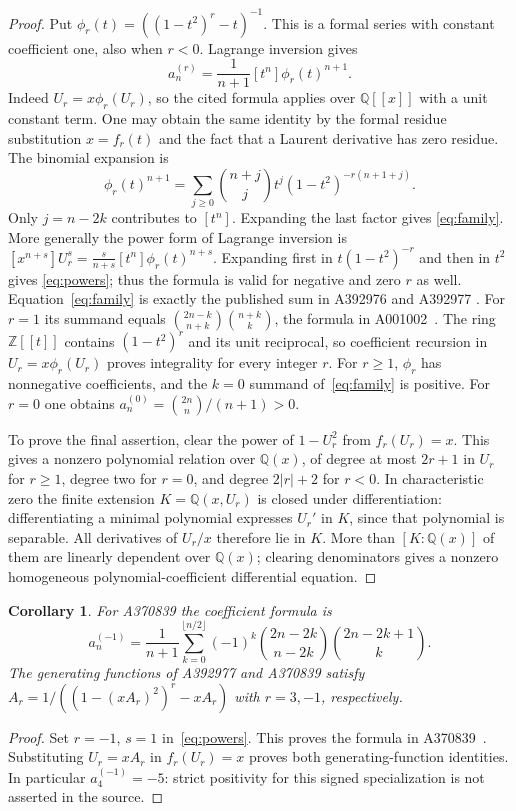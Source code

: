 \documentclass[10pt]{article}
\newtheorem{corollary}[theorem]{Corollary}
\newcommand{\Q}{\mathbb{Q}}
\newcommand{\Z}{\mathbb{Z}}
\begin{document}
\begin{proof}
Put $\phi_r(t)=((1-t^2)^r-t)^{-1}$. This is a formal series with
constant coefficient one, also when $r<0$. Lagrange inversion
\cite[Theorem 2.1.1, equation (2.1.1)]{gessel} gives
\begin{equation}\label{eq:lagrange}
 a_n^{(r)}=\frac{1}{n+1}[t^n]\phi_r(t)^{n+1}.
\end{equation}
Indeed $U_r=x\phi_r(U_r)$, so the cited formula applies over $\Q[[x]]$
with a unit constant term. One may obtain the same identity by the formal
residue substitution $x=f_r(t)$ and the fact that a Laurent derivative has
zero residue.
The binomial expansion is
\[
 \phi_r(t)^{n+1}=\sum_{j\geq0}\binom{n+j}{j}
 t^j(1-t^2)^{-r(n+1+j)}.
\]
Only $j=n-2k$ contributes to $[t^n]$. Expanding the last factor gives
\eqref{eq:family}. More generally the power form of Lagrange inversion is
$[x^{n+s}]U_r^s=\frac{s}{n+s}[t^n]\phi_r(t)^{n+s}$.
Expanding first in $t(1-t^2)^{-r}$ and then in $t^2$ gives
\eqref{eq:powers}; thus the formula is valid for negative and zero $r$ as
well. Equation~\eqref{eq:family} is exactly the published sum in A392976 and A392977
\cite{oeis,oeis3}. For $r=1$ its summand equals
$\binom{2n-k}{n+k}\binom{n+k}{k}$, the formula in A001002~\cite{oeis1}.
The ring $\Z[[t]]$ contains $(1-t^2)^r$ and its unit reciprocal,
so coefficient recursion in $U_r=x\phi_r(U_r)$ proves integrality for every
integer $r$. For $r\geq1$, $\phi_r$ has nonnegative coefficients, and the
$k=0$ summand of~\eqref{eq:family} is positive. For $r=0$ one obtains
$a_n^{(0)}=\binom{2n}{n}/(n+1)>0$.

To prove the final assertion, clear the power of $1-U_r^2$ from
$f_r(U_r)=x$. This gives a nonzero polynomial relation over $\Q(x)$,
of degree at most $2r+1$ in $U_r$ for $r\geq1$, degree two for $r=0$,
and degree $2|r|+2$ for $r<0$. In characteristic zero the finite extension
$K=\Q(x,U_r)$ is closed under differentiation: differentiating a minimal
polynomial expresses $U_r'$ in $K$, since that polynomial is separable.
All derivatives of $U_r/x$ therefore lie in $K$. More than $[K:\Q(x)]$
of them are linearly dependent over $\Q(x)$; clearing denominators gives
a nonzero homogeneous polynomial-coefficient differential equation.
\end{proof}

\begin{corollary}\label{cor:signed}
For A370839 the coefficient formula is
\[
 a_n^{(-1)}=\frac{1}{n+1}
 \sum_{k=0}^{\lfloor n/2\rfloor}(-1)^k
 \binom{2n-2k}{n-2k}\binom{2n-2k+1}{k}.
\]
The generating functions of A392977 and A370839 satisfy
$A_r=1/((1-(xA_r)^2)^r-xA_r)$ with $r=3,-1$, respectively.
\end{corollary}
\begin{proof}
Set $r=-1$, $s=1$ in~\eqref{eq:powers}. This proves the formula in
A370839~\cite{oeism1}. Substituting $U_r=xA_r$ in $f_r(U_r)=x$
proves both generating-function identities. In particular $a_4^{(-1)}=-5$:
strict positivity for this signed specialization is not asserted in the source.
\end{proof}
\end{document}
